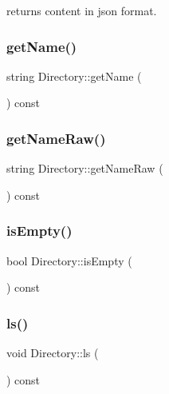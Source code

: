 returns content in json format. 

\mbox{\label{class_directory_adfb3c1b9b65ca47aaef4c91fb44adf83}} 
\subsubsection{\texorpdfstring{get\+Name()}{getName()}}
{\footnotesize\ttfamily string Directory\+::get\+Name (\begin{DoxyParamCaption}{ }\end{DoxyParamCaption}) const\hspace{0.3cm}{\ttfamily [inline]}}

\mbox{\label{class_directory_ac9641eabb49e810239d66bcc99bb8e98}} 
\subsubsection{\texorpdfstring{get\+Name\+Raw()}{getNameRaw()}}
{\footnotesize\ttfamily string Directory\+::get\+Name\+Raw (\begin{DoxyParamCaption}{ }\end{DoxyParamCaption}) const\hspace{0.3cm}{\ttfamily [inline]}}

\mbox{\label{class_directory_a5d3efa22fedc9f37963b2217e60beb3c}} 
\subsubsection{\texorpdfstring{is\+Empty()}{isEmpty()}}
{\footnotesize\ttfamily bool Directory\+::is\+Empty (\begin{DoxyParamCaption}{ }\end{DoxyParamCaption}) const}

\mbox{\label{class_directory_a97bf31f9a554ff687a410f735d8770dd}} 
\subsubsection{\texorpdfstring{ls()}{ls()}}
{\footnotesize\ttfamily void Directory\+::ls (\begin{DoxyParamCaption}{ }\end{DoxyParamCaption}) const}



